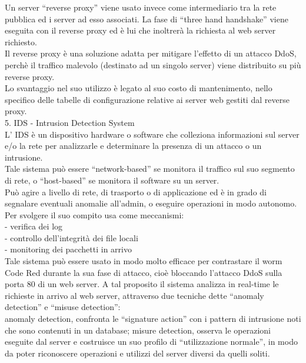Un server “reverse proxy” viene usato invece come intermediario tra la rete pubblica ed i server ad esso associati. La fase di “three hand handshake” viene eseguita con il reverse proxy ed è lui che inoltrerà la richiesta al web server richiesto.\\

Il reverse proxy è una soluzione adatta per mitigare l’effetto di un attacco DdoS, perchè il traffico malevolo (destinato ad un singolo server) viene distribuito su più reverse proxy.\\
Lo svantaggio nel suo utilizzo è legato al suo costo di mantenimento, nello specifico delle tabelle di configurazione relative ai server web gestiti dal reverse proxy.\\


5. IDS - Intrusion Detection System\\
L’ IDS è un dispositivo hardware o software che colleziona informazioni sul server e/o la rete per analizzarle e determinare la presenza di un attacco o un intrusione.\\
Tale sistema può essere “network-based” se monitora il traffico sul suo segmento di rete, o “host-based” se monitora il software su un server.\\
Può agire a livello di rete, di trasporto o di applicazione ed è in grado di segnalare eventuali anomalie all’admin, o eseguire operazioni in modo autonomo.\\
Per svolgere il suo compito usa come meccanismi:\\
- verifica dei log\\
- controllo dell’integrità dei file locali\\
- monitoring dei pacchetti in arrivo\\

Tale sistema può essere usato in modo molto efficace per contrastare il worm Code Red durante la sua fase di attacco, cioè bloccando l'attacco DdoS sulla porta 80 di un web server. A tal proposito il sistema analizza in real-time le richieste in arrivo al web server, attraverso due tecniche dette “anomaly detection” e “misuse detection”:\\
anomaly detection, confronta le “signature action” con i pattern di intrusione noti che sono contenuti in un database;
misure detection, osserva le operazioni eseguite dal server e costruisce un suo profilo di “utilizzazione normale”, in modo da poter riconoscere operazioni e utilizzi del server diversi da quelli soliti.\\

